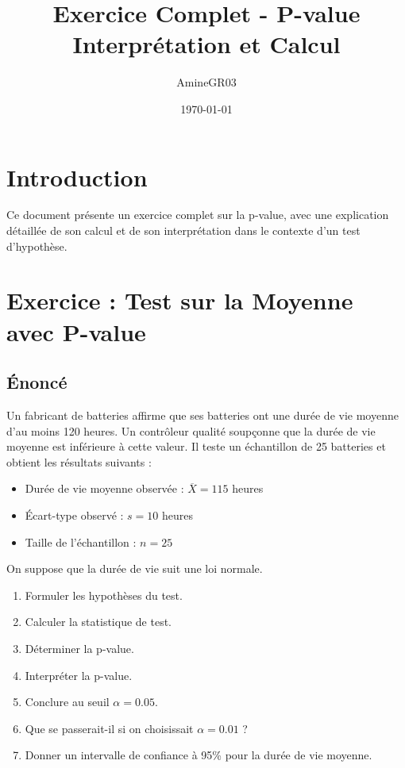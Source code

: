 \documentclass[11pt,a4paper]{article}
\title{Exercice Complet - P-value\\
\large Interprétation et Calcul}
\author{AmineGR03}
\date{\today}
\begin{document}
\maketitle

\tableofcontents
\newpage

\section{Introduction}

Ce document présente un exercice complet sur la p-value, avec une explication détaillée de son calcul et de son interprétation dans le contexte d'un test d'hypothèse.

\newpage

\section{Exercice : Test sur la Moyenne avec P-value}

\subsection{Énoncé}

Un fabricant de batteries affirme que ses batteries ont une durée de vie moyenne d'au moins 120 heures. Un contrôleur qualité soupçonne que la durée de vie moyenne est inférieure à cette valeur. Il teste un échantillon de 25 batteries et obtient les résultats suivants :
\begin{itemize}
    \item Durée de vie moyenne observée : $\overline{X} = 115$ heures
    \item Écart-type observé : $s = 10$ heures
    \item Taille de l'échantillon : $n = 25$
\end{itemize}

On suppose que la durée de vie suit une loi normale.

\begin{enumerate}
    \item Formuler les hypothèses du test.
    \item Calculer la statistique de test.
    \item Déterminer la p-value.
    \item Interpréter la p-value.
    \item Conclure au seuil $\alpha = 0.05$.
    \item Que se passerait-il si on choisissait $\alpha = 0.01$ ?
    \item Donner un intervalle de confiance à 95\% pour la durée de vie moyenne.
\end{enumerate}
\end{document}
